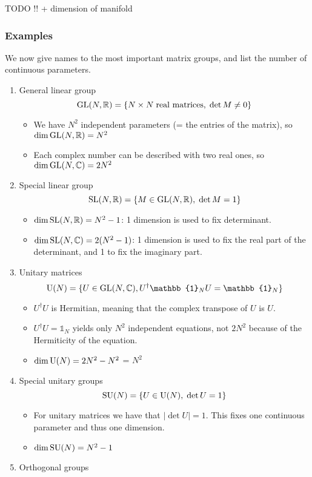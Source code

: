 TODO !! + dimension of manifold

\subsubsection{Examples}
We now give names to the most important matrix groups, and list the number of continuous parameters.
\begin{enumerate}
\item General linear group
\[ \operatorname{GL}(N,\mathbb{R}) = \{N\times N \;\text{real matrices}, \; \det M \neq 0\} \]
\begin{itemize}
\item We have $N^2$ independent parameters (= the entries of the matrix), so $\dim \operatorname{GL}(N,\mathbb{R}) = N^2$
\item Each complex number can be described with two real ones, so $\dim \operatorname{GL}(N, \mathbb{C}) = 2N^2$
\end{itemize}
\item Special linear group
\[ \operatorname{SL}(N,\mathbb{R}) = \{M\in\operatorname{GL}(N,\mathbb{R}), \;\det M = 1\} \]
\begin{itemize}
\item $\dim \operatorname{SL}(N,\mathbb{R}) = N^2-1$: 1 dimension is used to fix determinant.
\item $\dim \operatorname{SL}(N,\mathbb{C}) = 2(N^2-1)$: 1 dimension is used to fix the real part of the determinant, and 1 to fix the imaginary part.
\end{itemize}
\item Unitary matrices
\[ \U(N) = \{U\in\GL(N,\C), U^\dagger\mathbb{1}_NU = \mathbb{1}_N\} \]
\begin{itemize}
\item $U^\dagger U$ is Hermitian, meaning that the complex transpose of $U$ is $U$.
\item $U^\dagger U = \mathbb{1}_N$ yields only $N^2$ independent equations, not $2N^2$ because of the Hermiticity of the equation.
\item $\dim \operatorname{U}(N) = 2N^2-N^2$ = $N^2$
\end{itemize}
\item Special unitary groups
\[ \operatorname{SU}(N) = \{U\in\operatorname{U}(N),\; \det U = 1\} \]
\begin{itemize}
\item For unitary matrices we have that $|\det U| = 1$. This fixes one continuous parameter and thus one dimension.
\item $\dim \operatorname{SU}(N) = N^2 - 1$
\end{itemize}
\item Orthogonal groups
\begin{itemize}

\end{itemize}
\end{enumerate}
